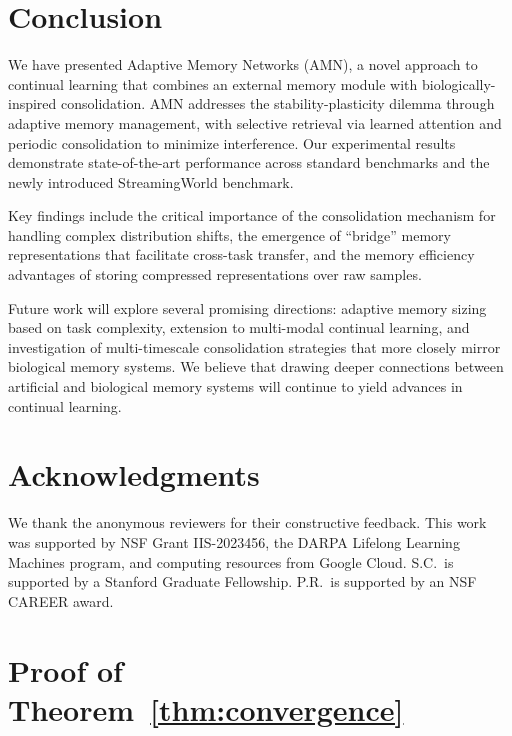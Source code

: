 \documentclass[11pt]{article}
\begin{document}
\section{Conclusion}
\label{sec:conclusion}

We have presented Adaptive Memory Networks (AMN), a novel approach to continual learning that combines an external memory module with biologically-inspired consolidation. AMN addresses the stability-plasticity dilemma through adaptive memory management, with selective retrieval via learned attention and periodic consolidation to minimize interference. Our experimental results demonstrate state-of-the-art performance across standard benchmarks and the newly introduced StreamingWorld benchmark.

Key findings include the critical importance of the consolidation mechanism for handling complex distribution shifts, the emergence of ``bridge'' memory representations that facilitate cross-task transfer, and the memory efficiency advantages of storing compressed representations over raw samples.

Future work will explore several promising directions: adaptive memory sizing based on task complexity, extension to multi-modal continual learning, and investigation of multi-timescale consolidation strategies that more closely mirror biological memory systems. We believe that drawing deeper connections between artificial and biological memory systems will continue to yield advances in continual learning.

\section*{Acknowledgments}

We thank the anonymous reviewers for their constructive feedback. This work was supported by NSF Grant IIS-2023456, the DARPA Lifelong Learning Machines program, and computing resources from Google Cloud. S.C.\ is supported by a Stanford Graduate Fellowship. P.R.\ is supported by an NSF CAREER award.




\appendix

\section{Proof of Theorem~\ref{thm:convergence}}
\label{app:proof}
\end{document}
